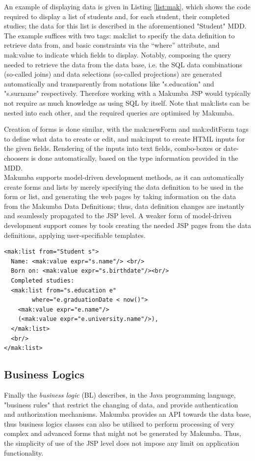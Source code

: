 \documentclass{llncs}
\begin{document}
An example of displaying data is given in Listing \ref{list:mak}, which shows the code required to display a list of students and, for each student, their completed studies; the data for this list is described in the aforementioned "Student" MDD. The example suffices with two tags: mak:list to specify the data definition to retrieve data from, and basic constraints via the ``where'' attribute, and mak:value to indicate which fields to display. Notably, composing the query needed to retrieve the data from the data base, i.e. the SQL data combinations (so-called joins) and data selections (so-called projections) are generated automatically and transparently from notations like "s.education" and "s.surname" respectively. Therefore working with a Makumba JSP would typically not require as much knowledge as using SQL by itself. Note that mak:lists can be nested into each other, and the required queries are optimised by Makumba.

Creation of forms is done similar, with the mak:newForm and mak:editForm tags to define what data to create or edit, and mak:input to create HTML inputs for the given fields. Rendering of the inputs into text fields, combo-boxes or date-choosers is done automatically, based on the type information provided in the MDD.\\

Makumba supports model-driven development methods, as it can automatically create forms and lists by merely specifying the data definition to be used in the form or list, and generating the web pages by taking information on the data from the Makumba Data Definitions; thus, data definition changes are instantly and seamlessly propagated to the JSP level. A weaker form of model-driven development support comes by tools creating the needed JSP pages from the data definitions, applying user-specifiable templates.

\lstset{basicstyle=\small, captionpos=b, caption=Example of viewing data with the Makumba JSP tag library, label=list:mak, frame=shadowbox}
\begin{lstlisting}
<mak:list from="Student s">
  Name: <mak:value expr="s.name"/> <br/>
  Born on: <mak:value expr="s.birthdate"/><br/>
  Completed studies:
  <mak:list from="s.education e"
  	    where="e.graduationDate < now()">
    <mak:value expr="e.name"/>
    (<mak:value expr="e.university.name"/>),
  </mak:list>
  <br/>
</mak:list>
\end{lstlisting}

\subsection{Business Logics}
Finally the \textit{business logic} (BL) describes, in the Java programming language, "business rules" that restrict the changing of data, and provide authentication and authorization mechanisms. Makumba provides an API towards the data base, thus business logics classes can also be utilised to perform processing of very complex and advanced forms that might not be generated by Makumba. Thus, the simplicity of use of the JSP level does not impose any limit on application functionality.\\
\end{document}
